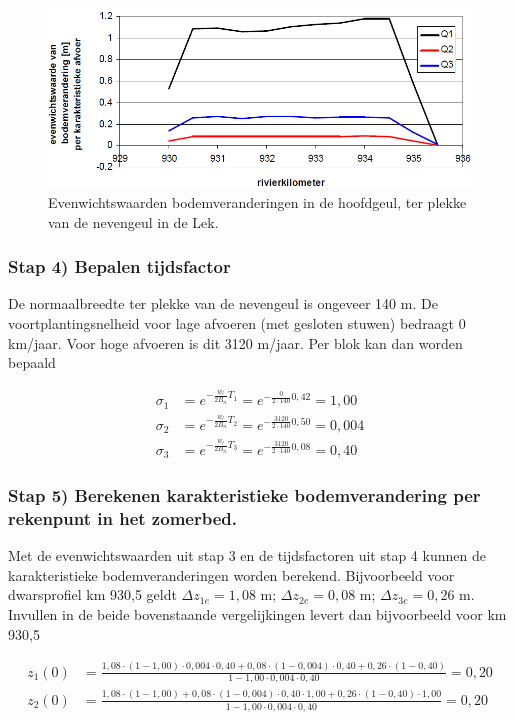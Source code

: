 \begin{figure}
\includegraphics[width=\columnwidth]{figures/Fig11.png}
\caption{Evenwichtswaarden bodemveranderingen in de hoofdgeul, ter plekke van de nevengeul in de Lek.}
\label{Fig11}
\end{figure}

\subsubsection*{Stap 4) Bepalen tijdsfactor}

De normaalbreedte ter plekke van de nevengeul is ongeveer 140 m.
De voortplantingsnelheid voor lage afvoeren (met gesloten stuwen) bedraagt 0 km/jaar.
Voor hoge afvoeren is dit 3120 m/jaar. Per blok kan dan worden bepaald

\begin{align}
\sigma_1 &= e^{-\frac{w_l}{2B_n}T_1} = e^{-\frac{0}{2 \cdot 140} 0,42} = 1,00 \\
\sigma_2 &= e^{-\frac{w_l}{2B_n}T_2} = e^{-\frac{3120}{2 \cdot 140} 0,50} = 0,004 \\
\sigma_3 &= e^{-\frac{w_l}{2B_n}T_3} = e^{-\frac{3120}{2 \cdot 140} 0,08} = 0,40
\end{align}

\subsubsection*{Stap 5) Berekenen karakteristieke bodemverandering per rekenpunt in het zomerbed.}

Met de evenwichtswaarden uit stap 3 en de tijdsfactoren uit stap 4 kunnen de karakteristieke bodemveranderingen worden berekend.
Bijvoorbeeld voor dwarsprofiel km 930,5 geldt $\Delta z_{1e}=1,08$ m; $\Delta z_{2e}=0,08$ m; $\Delta z_{3e}=0,26$ m.
Invullen in de beide bovenstaande vergelijkingen levert dan bijvoorbeeld voor km 930,5

\begin{align}
z_1(0) &= \tfrac{1,08 \cdot (1-1,00) \cdot 0,004 \cdot 0,40 + 0,08 \cdot (1-0,004) \cdot 0,40 + 0,26 \cdot (1-0,40)}{1 - 1,00 \cdot 0,004 \cdot 0,40} = 0,20\\
z_2(0) &= \tfrac{1,08 \cdot (1-1,00) + 0,08 \cdot (1-0,004) \cdot 0,40 \cdot 1,00 + 0,26 \cdot (1-0,40) \cdot 1,00}{1 - 1,00 \cdot 0,004 \cdot 0,40} = 0,20
\end{align}

